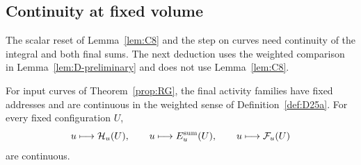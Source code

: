 \subsection{Continuity at fixed volume}\label{subsec:D-continuity}

The scalar reset of Lemma~\ref{lem:C8} and the step on curves need continuity of the integral and both final sums. The next deduction uses the weighted comparison in Lemma~\ref{lem:D-preliminary} and does not use Lemma~\ref{lem:C8}.

\begin{lemma}\label{lem:D6}
For input curves of Theorem~\ref{prop:RG}, the final activity families have fixed addresses and are continuous in the weighted sense of Definition~\ref{def:D25a}. For every fixed configuration $U$,
\begin{equation*}
u\longmapsto\mathcal H_u(U),\qquad
u\longmapsto E_u^{\rm sum}(U),\qquad
u\longmapsto\mathcal F_u(U)
\end{equation*}
are continuous.
\end{lemma}


